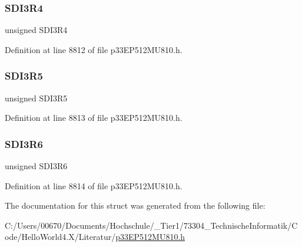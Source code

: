 \subsubsection{\texorpdfstring{S\+D\+I3\+R4}{SDI3R4}}
{\footnotesize\ttfamily unsigned S\+D\+I3\+R4}



Definition at line 8812 of file p33\+E\+P512\+M\+U810.\+h.

\mbox{\label{structtag_r_p_i_n_r29_b_i_t_s_af7f63d05bf9a7633fa00feeecbf36db2}} 
\subsubsection{\texorpdfstring{S\+D\+I3\+R5}{SDI3R5}}
{\footnotesize\ttfamily unsigned S\+D\+I3\+R5}



Definition at line 8813 of file p33\+E\+P512\+M\+U810.\+h.

\mbox{\label{structtag_r_p_i_n_r29_b_i_t_s_af54ac19014318287133707056c4a2d14}} 
\subsubsection{\texorpdfstring{S\+D\+I3\+R6}{SDI3R6}}
{\footnotesize\ttfamily unsigned S\+D\+I3\+R6}



Definition at line 8814 of file p33\+E\+P512\+M\+U810.\+h.



The documentation for this struct was generated from the following file\+:\begin{DoxyCompactItemize}
\item 
C\+:/\+Users/00670/\+Documents/\+Hochschule/\+\_\+\+Tier1/73304\+\_\+\+Technische\+Informatik/\+Code/\+Hello\+World4.\+X/\+Literatur/\hyperlink{p33_e_p512_m_u810_8h}{p33\+E\+P512\+M\+U810.\+h}\end{DoxyCompactItemize}
